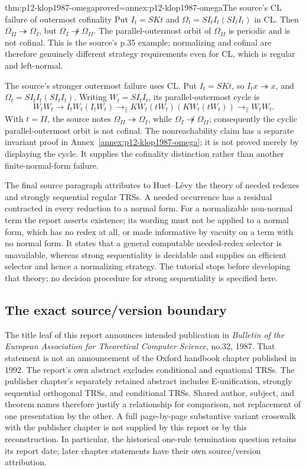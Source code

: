 \begin{hbtheorem}{thm:p12-klop1987-omega}{proved=annex:p12-klop1987-omega}{The source's CL failure of outermost cofinality}
Put \(I_t=SKt\) and \(\Omega_t=SI_tI_t(SI_tI_t)\) in CL.
Then \(\Omega_{II}\twoheadrightarrow\Omega_I\), but
\(\Omega_I\not\twoheadrightarrow\Omega_{II}\).
The parallel-outermost orbit of \(\Omega_{II}\) is periodic and is
not cofinal. This is the source's p.35 example; normalizing and cofinal
are therefore genuinely different strategy requirements even for CL,
which is regular and left-normal.
\end{hbtheorem}

The source's stronger outermost failure uses CL. Put
\(I_t=SKt\), so \(I_t x\twoheadrightarrow x\), and
\(\Omega_t=SI_tI_t(SI_tI_t)\).
Writing \(W_t=SI_tI_t\), its parallel-outermost cycle is
\[
 W_tW_t\to I_tW_t(I_tW_t)
 \to_{\parallel}KW_t(tW_t)(KW_t(tW_t))
 \to_{\parallel}W_tW_t.
\]
With \(t=II\), the source notes
\(\Omega_{II}\twoheadrightarrow\Omega_I\), while
\(\Omega_I\not\twoheadrightarrow\Omega_{II}\); consequently the
cyclic parallel-outermost orbit is not cofinal. The nonreachability claim
has a separate invariant proof in Annex~\ref{annex:p12-klop1987-omega};
it is not proved merely by displaying the cycle. It supplies the cofinality distinction rather than another
finite-normal-form failure.

The final source paragraph attributes to Huet--L\'evy the theory of
needed redexes and strongly sequential regular TRSs. A needed occurrence
has a residual contracted in every reduction to a normal form. For a
normalizable non-normal term the report asserts existence; its wording
must not be applied to a normal form, which has no redex at all, or made
informative by vacuity on a term with no normal form. It states that a
general computable needed-redex selector is unavailable, whereas strong
sequentiality is decidable and supplies an efficient selector and hence
a normalizing strategy. The tutorial stops before developing that theory;
no decision procedure for strong sequentiality is specified here.

\subsection{The exact source/version boundary}

The title leaf of this report announces intended publication in
\emph{Bulletin of the European Association for Theoretical Computer
Science}, no.32, 1987. That statement is not an announcement of the
Oxford handbook chapter published in 1992. The report's own abstract
excludes conditional and equational TRSs. The publisher chapter's
separately retained abstract includes E-unification, strongly sequential
orthogonal TRSs, and conditional TRSs. Shared author, subject, and theorem
names therefore justify a relationship for comparison, not replacement
of one presentation by the other. A full page-by-page substantive
variant crosswalk with the publisher chapter is not supplied by this
report or by this reconstruction. In particular, the historical one-rule
termination question retains its report date; later chapter statements
have their own source/version attribution.

